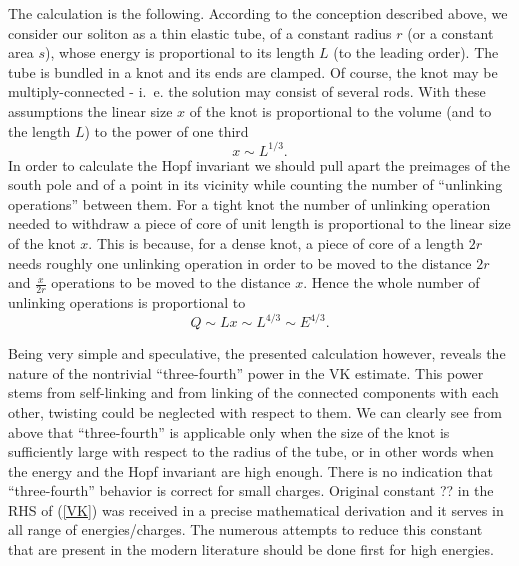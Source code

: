 \documentclass[a4paper,12pt]{article}
\begin{document}
	The calculation is the following. According to the conception
	described above, we consider
	our soliton as a thin elastic tube, of a constant radius
    $ r $
	(or a constant area $ s $),
	whose energy is proportional to its length
    $ L $ (to the leading order).
	The tube is bundled in a knot and its ends are clamped.
	Of course, the knot may be multiply-connected - i.~e. the solution
	may consist of several rods. 
	With these assumptions the linear size 
    $ x $
	of the knot is proportional to the volume (and to the length
    $ L $)
	to the power of one third
$$ x \sim L^{1/3} . $$
	In order to calculate the Hopf invariant
	we should pull apart the preimages of the south 
	pole and of a point in its vicinity while 
	counting the number of ``unlinking operations'' between them.
	For a tight knot the number of unlinking operation needed
	to withdraw a piece of core of unit length is proportional to the
	linear size of the knot 
    $ x $. 
	This is because, for a dense knot,
	a piece of core of a length
    $ 2r $
	needs roughly one unlinking operation in order to be moved to
	the distance
    $ 2r $ and
    $ \frac{x}{2r} $
	operations to be moved to the distance
    $ x $.
	Hence the whole number of unlinking operations is proportional to
\begin{equation}
\label{HH}
	Q \sim L x \sim L^{4/3} \sim E^{4/3} .
\end{equation}

	Being very simple and speculative, the presented calculation
	however, reveals the nature of the nontrivial ``three-fourth'' power
	in the VK estimate. This power stems from self-linking 
	and from linking of the connected components with
	each other, twisting could be neglected with respect to them.
	We can clearly see from above that ``three-fourth'' is 
	applicable only when the size of the knot is sufficiently
	large with respect to the radius of the tube, or in other
	words when the energy and the Hopf invariant are high enough.
	There is no indication that ``three-fourth'' behavior is correct
	for small charges.
	Original constant ?? in the RHS of
(\ref{VK})
	was received in a precise mathematical derivation and it
	serves in all range of energies/charges.
	The numerous attempts to reduce this constant 
	that are present in the modern literature should be done first for 
	high energies.
\end{document}
